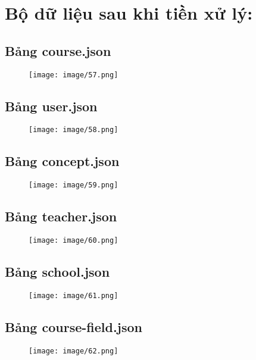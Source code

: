 \section{Bộ dữ liệu sau khi tiền xử lý:}
\subsection{Bảng course.json}
\begin{figure}[h]
    \centering
    \texttt{[image: image/57.png]}
\end{figure}
\subsection{Bảng user.json}
\begin{figure}[h]
    \centering
    \texttt{[image: image/58.png]}
\end{figure}
\subsection{Bảng concept.json}
\begin{figure}[h]
    \centering
    \texttt{[image: image/59.png]}
\end{figure}
\newpage
\subsection{Bảng teacher.json}
\begin{figure}[h]
    \centering
    \texttt{[image: image/60.png]}
\end{figure}
\subsection{Bảng school.json}
\begin{figure}[h]
    \centering
    \texttt{[image: image/61.png]}
\end{figure}
\subsection{Bảng course-field.json}
\begin{figure}[h]
    \centering
    \texttt{[image: image/62.png]}
\end{figure}
